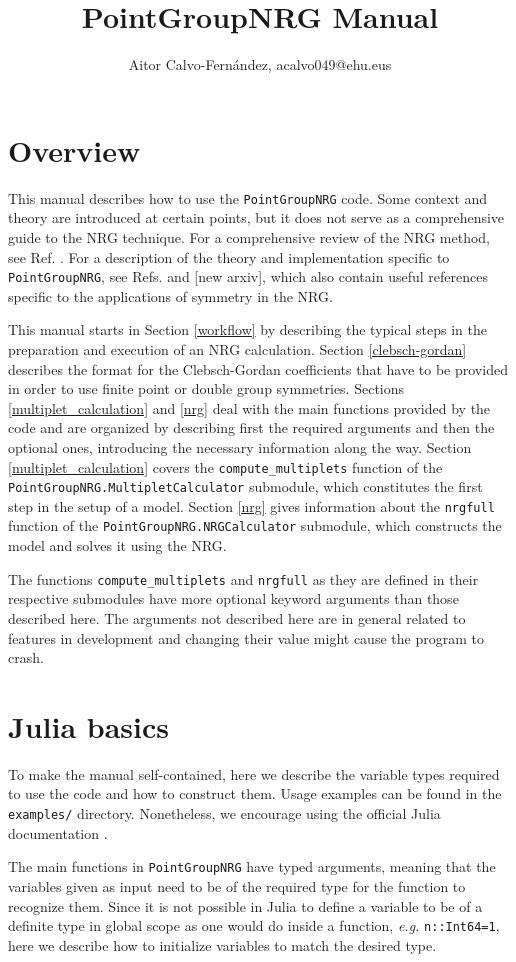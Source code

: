 \documentclass[notitlepage]{article}
\title{PointGroupNRG Manual}
\author{Aitor Calvo-Fernández, acalvo049@ehu.eus}
\begin{document}
\maketitle

\tableofcontents

\section{Overview}\label{overview}
This manual describes how to use the \texttt{PointGroupNRG}
code. Some context and theory are introduced at certain
points, but it does not serve as a comprehensive guide to
the NRG technique. For a comprehensive review of the NRG method, see
Ref. \cite{bulla2008}. For a description of the theory and
implementation specific to \texttt{PointGroupNRG}, see Refs.
\cite{calvo-fernandez2024} and [new arxiv], which also
contain useful references specific to the applications of
symmetry in the NRG.
\par
This manual starts in Section \ref{workflow} by describing
the typical steps in the preparation and execution of an NRG
calculation. Section \ref{clebsch-gordan} describes the
format for the Clebsch-Gordan coefficients that have to be
provided in order to use finite point or double group
symmetries. Sections \ref{multiplet_calculation} and
\ref{nrg} deal with the main functions provided
by the code and are organized by describing first the
required arguments and then the optional ones, introducing
the necessary information along the way. Section
\ref{multiplet_calculation} covers the
\texttt{compute\_multiplets} function of the
\texttt{PointGroupNRG.MultipletCalculator} submodule, which
constitutes the first step in the setup of a model. Section
\ref{nrg} gives information about the
\texttt{nrgfull} function of the
\texttt{PointGroupNRG.NRGCalculator} submodule, which
constructs the model and solves it using the NRG.
\par
The functions \texttt{compute\_multiplets} and
\texttt{nrgfull} as they are defined in their respective
submodules have more optional keyword arguments than those
described here. The arguments not described here
are in general related to features in development and
changing their value might cause the program to crash.

\section{Julia basics}
To make the manual self-contained, here we describe the
variable types required to use the code and how to construct
them. Usage examples can be found in the 
\texttt{examples/} directory. Nonetheless, we encourage
using the official Julia documentation \cite{juliadoc}.
\par
The main functions in \texttt{PointGroupNRG} have typed
arguments, meaning that the variables given as input need to
be of the required type for the function to recognize them. 
Since it is not possible in Julia to define a variable to be
of a definite type in global scope as one would do inside a
function, \textit{e.g.} \texttt{n::Int64=1}, here we describe 
how to initialize variables to match the desired type.
\end{document}
